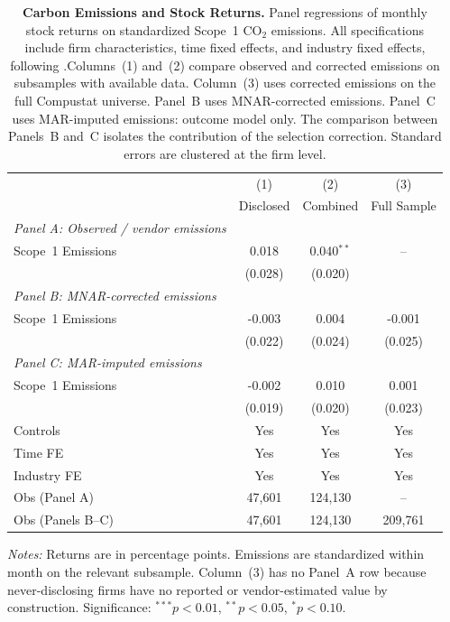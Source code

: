\documentclass[a4paper,12pt]{article}
\newcommand{\citet}[1]{\textcite{#1}}
\begin{document}
\begin{table}[htbp]
\footnotesize\centering
\caption{\textbf{Carbon Emissions and Stock Returns.}
Panel regressions of monthly stock returns on standardized Scope~1 CO$_2$ emissions.
All specifications include firm characteristics, time fixed effects, and industry fixed effects,
following \citet{bolton2021investors}.Columns~(1) and~(2) compare observed and corrected emissions on subsamples with available data. Column~(3) uses corrected emissions on the full Compustat universe.
Panel~B uses MNAR-corrected emissions. Panel~C uses MAR-imputed emissions: outcome model only. The comparison between Panels~B and~C isolates the contribution of the selection correction. Standard errors are clustered at the firm level.}
\label{tab:returns_main}
\begin{tabular}{lccc}
\toprule
 & (1) & (2) & (3) \\
 & Disclosed & Combined & Full Sample \\
\midrule
\textit{Panel A: Observed / vendor emissions} & & & \\[2pt]
Scope~1 Emissions & 0.018 & 0.040$^{**}$ & -- \\
 & (0.028) & (0.020) & \\

\textit{Panel B: MNAR-corrected emissions} & & & \\[2pt]
Scope~1 Emissions & -0.003 & 0.004 & -0.001 \\
 & (0.022) & (0.024) & (0.025) \\

\textit{Panel C: MAR-imputed emissions} & & & \\[2pt]
Scope~1 Emissions & -0.002 & 0.010 & 0.001 \\
 & (0.019) & (0.020) & (0.023) \\
\midrule
Controls & Yes & Yes & Yes \\
Time FE & Yes & Yes & Yes \\
Industry FE & Yes & Yes & Yes \\
Obs (Panel A) & 47,601 & 124,130 & -- \\
Obs (Panels B--C) & 47,601 & 124,130 & 209,761 \\
\bottomrule
\end{tabular}
\begin{flushleft}\footnotesize
\textit{Notes:} Returns are in percentage points.
Emissions are standardized within month on the relevant subsample. Column~(3) has no Panel~A row because never-disclosing firms have no
reported or vendor-estimated value by construction.
Significance: $^{***}p<0.01$, $^{**}p<0.05$, $^{*}p<0.10$.
\end{flushleft}
\end{table}
\end{document}
